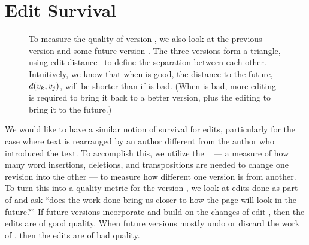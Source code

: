 \section{Edit Survival}
\label{sec:editquality}

\begin{figure}[t]
\centering
{}
\hspace{1ex}
\caption{To measure the quality of version , we also
	look at the previous version  and some future
	version .
	The three versions form a triangle, using
	edit distance~\cite{Levenshtein66} to define the separation
	between each other.
	Intuitively, we know that when  is good,
	the distance to the future, $d(v_{k},v_{j})$,
	will be shorter than if  is bad.
	(When  is bad, more editing is required to
	bring it back to a better version, plus the editing
	to bring it to the future.)
}
\label{fig-editcontr}
\end{figure}

  We would like to have a similar notion of survival for edits,
  particularly for the case where text is rearranged by an author
  different from the author who introduced the text.
  To accomplish this, we utilize the
  ~\cite{Levenshtein66,TichyEditDist,EditDistanceMoves,Adler2007}
  --- a measure of how many word insertions, deletions,
  and transpositions are needed to change one revision into the other ---
  to measure how different one version is from another.
  To turn this into a quality metric for the
  version , we look at edits done as part of 
  and ask ``does the work done bring us closer to how the page
  will look in the future?''
  If future versions incorporate and build on the changes of edit ,
  then the edits are of good quality.
  When future versions mostly undo or discard the work of ,
  then the edits are of bad quality.

